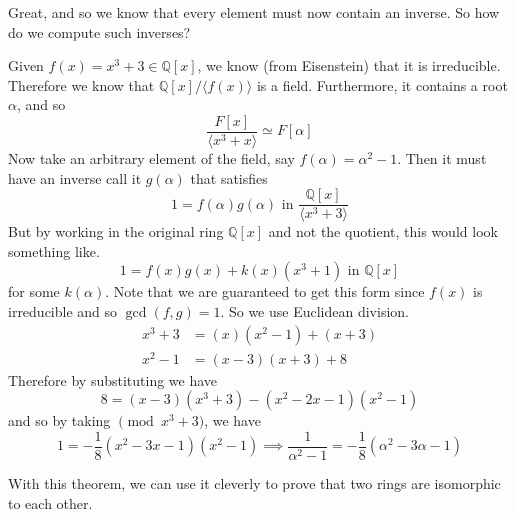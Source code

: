   Great, and so we know that every element must now contain an inverse. So how do we compute such inverses? 

  \begin{example} 
    Given $f(x) = x^3 + 3 \in \mathbb{Q}[x]$, we know (from Eisenstein) that it is irreducible. Therefore we know that $\mathbb{Q}[x]/\langle f(x) \rangle$ is a field. Furthermore, it contains a root $\alpha$, and so 
    \begin{equation}
      \frac{F[x]}{\langle x^3 + x \rangle} \simeq F[\alpha]
    \end{equation}
    Now take an arbitrary element of the field, say $f(\alpha) = \alpha^2 - 1$. Then it must have an inverse call it $g(\alpha)$ that satisfies 
    \begin{equation}
      1 = f(\alpha) g(\alpha) \text{ in } \frac{\mathbb{Q}[x]}{\langle x^3 + 3 \rangle}
    \end{equation}
    But by working in the original ring $\mathbb{Q}[x]$ and not the quotient, this would look something like. 
    \begin{equation}
      1 = f(x) g(x) + k(x) (x^3 + 1) \text{ in } \mathbb{Q}[x]
    \end{equation} 
    for some $k(\alpha)$. Note that we are guaranteed to get this form since $f(x)$ is irreducible and so $\gcd(f, g) = 1$. So we use Euclidean division. 
    \begin{align}
      x^3 + 3 & = (x) (x^2 - 1) + (x + 3) \label{hi}\\
      x^2 - 1 & = (x - 3) (x + 3) + 8
    \end{align}
    Therefore by substituting we have 
    \begin{equation}
      8 = (x - 3) (x^3 + 3) - (x^2 - 2x - 1) (x^2 - 1) 
    \end{equation} 
    and so by taking $\pmod{x^3 + 3}$, we have 
    \begin{equation}
      1 = -\frac{1}{8} (x^2 - 3x - 1) (x^2 - 1) \implies \frac{1}{\alpha^2 - 1} = -\frac{1}{8}(\alpha^2 - 3 \alpha - 1)
    \end{equation}
  \end{example}
  
  With this theorem, we can use it cleverly to prove that two rings are isomorphic to each other. 

